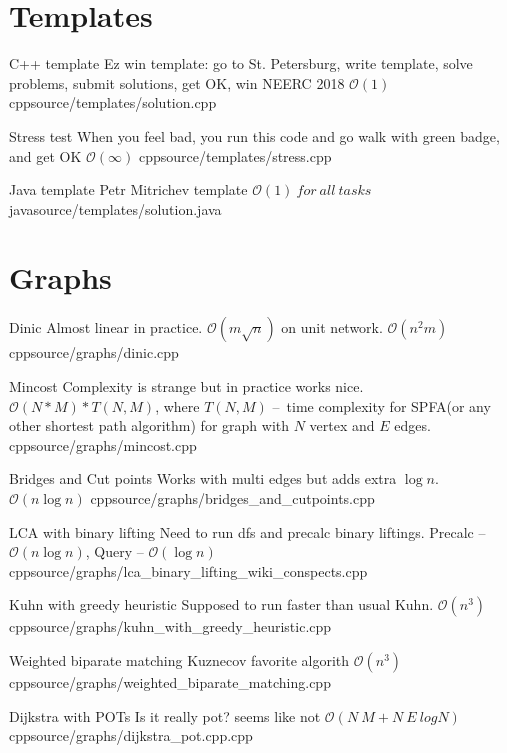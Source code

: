 \documentclass[landscape, 10pt, a4paper, oneside, twocolumn]{extarticle}
\begin{document}
\maketitlepage


\section{Templates}

\Algorithm
{C++ template}
{Ez win template: go to St. Petersburg, write template, solve problems, submit solutions, get OK, win NEERC 2018}
{$\mathcal{O}(1)$}
{cpp}{source/templates/solution.cpp}

\Algorithm
{Stress test}
{When you feel bad, you run this code and go walk with green badge, and get OK}
{$\mathcal{O}(\infty)$}
{cpp}{source/templates/stress.cpp}

\Algorithm
{Java template}
{Petr Mitrichev template}
{$\mathcal{O}(1)\ for\ all\ tasks$}
{java}{source/templates/solution.java}

\section{Graphs}

\Algorithm
{Dinic}
{Almost linear in practice. $\mathcal{O}(m \sqrt n)$ on unit network.}
{$\mathcal{O}(n^{2}m)$}
{cpp}{source/graphs/dinic.cpp}

\Algorithm
{Mincost}
{Complexity is strange but in practice works nice.}
{$\mathcal{O}(N * M) * T(N, M)$, where $T(N, M)$ – time complexity for SPFA(or any other shortest path algorithm) for graph with $N$ vertex and $E$ edges.}
{cpp}{source/graphs/mincost.cpp}

\Algorithm
{Bridges and Cut points}
{Works with multi edges but adds extra $ \log n$.}
{$\mathcal{O}(n \log n)$}
{cpp}{source/graphs/bridges_and_cutpoints.cpp}

\Algorithm
{LCA with binary lifting}
{Need to run dfs and precalc binary liftings.}
{Precalc – $\mathcal{O}(n \log n)$, Query – $\mathcal{O}(\log n)$}
{cpp}{source/graphs/lca_binary_lifting_wiki_conspects.cpp}

\Algorithm
{Kuhn with greedy heuristic}
{Supposed to run faster than usual Kuhn.}
{$\mathcal{O}(n^{3})$}
{cpp}{source/graphs/kuhn_with_greedy_heuristic.cpp}

\Algorithm
{Weighted biparate matching}
{Kuznecov favorite algorith}
{$\mathcal{O}(n^{3})$}
{cpp}{source/graphs/weighted_biparate_matching.cpp}

\Algorithm
{Dijkstra with POTs}
{Is it really pot? seems like not}
{$\mathcal{O}(N\ M + N\ E\ logN)$}
{cpp}{source/graphs/dijkstra_pot.cpp.cpp}
\end{document}
